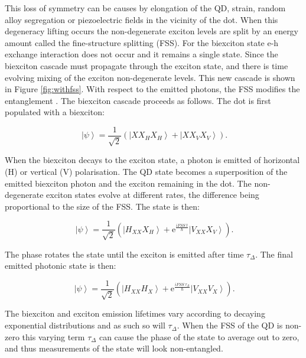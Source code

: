 \documentclass[12pt, twoside]{article}
\numberwithin{equation}{section}
\begin{document}
This loss of symmetry can be causes by elongation of the QD, strain,
random alloy segregation or piezoelectric fields in the vicinity of the
dot. When this degeneracy lifting occurs the non-degenerate exciton
levels are split by an energy amount called the fine-structure splitting
(FSS). For the biexciton state e-h exchange interaction does not occur
and it remains a single state. Since the biexciton cascade must
propagate through the exciton state, and there is time evolving mixing
of the exciton non-degenerate levels. This new cascade is shown in
Figure \ref{fig:withfss}. With respect to the emitted photons, the FSS
modifies the entanglement \cite{entangletime}. The biexciton cascade
proceeds as follows. The dot is first populated with a biexciton:

\begin{equation}
\ \left|\psi\right\rangle = \frac{1}{\sqrt{2}} \left(\left|XX_{H} X_H\right\rangle + \left|XX_{V} X_V\right\rangle \right).
\end{equation}

When the biexciton decays to the exciton state, a photon is emitted of
horizontal (H) or vertical (V) polarisation. The QD state becomes a
superposition of the emitted biexciton photon and the exciton remaining
in the dot. The non-degenerate exciton states evolve at different rates,
the difference being proportional to the size of the FSS. The state is
then:

\begin{equation}
\ \left|\psi\right\rangle = \frac{1}{\sqrt{2}} 
\left(\left|H_{XX} X_H\right\rangle + \mathrm e ^{\frac{i FSS \ t}{\hbar}}\left|V_{XX} X_V\right\rangle \right).
\end{equation}

The phase rotates the state until the exciton is emitted after time
$\tau_\Delta$. The final emitted photonic state is then:

\begin{equation}
\ \left|\psi\right\rangle = \frac{1}{\sqrt{2}} 
\left(\left|H_{XX} H_X\right\rangle + \mathrm e ^{\frac{i FSS \ \tau_\Delta}{\hbar}}\left|V_{XX} V_X\right\rangle \right).
\end{equation}

The biexciton and exciton emission lifetimes vary according to decaying
exponential distributions and as such so will $\tau_\Delta$. When the
FSS of the QD is non-zero this varying term $\tau_\Delta$ can cause the
phase of the state to average out to zero, and thus measurements of the
state will look non-entangled.
\end{document}
